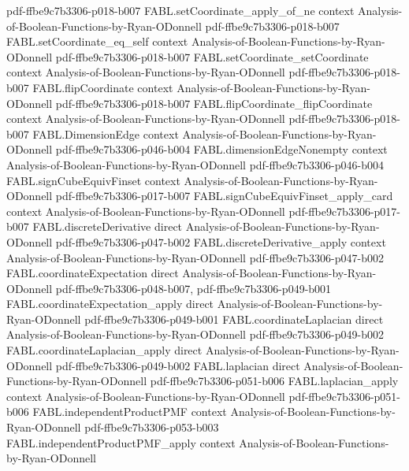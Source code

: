 \begin{theorem}
  {pdf-ffbe9c7b3306-p018-b007}
\proofstep
  {FABL.setCoordinate_apply_of_ne}
  {context}
  {Analysis-of-Boolean-Functions-by-Ryan-ODonnell}
  {pdf-ffbe9c7b3306-p018-b007}
\proofstep
  {FABL.setCoordinate_eq_self}
  {context}
  {Analysis-of-Boolean-Functions-by-Ryan-ODonnell}
  {pdf-ffbe9c7b3306-p018-b007}
\proofstep
  {FABL.setCoordinate_setCoordinate}
  {context}
  {Analysis-of-Boolean-Functions-by-Ryan-ODonnell}
  {pdf-ffbe9c7b3306-p018-b007}
\proofstep
  {FABL.flipCoordinate}
  {context}
  {Analysis-of-Boolean-Functions-by-Ryan-ODonnell}
  {pdf-ffbe9c7b3306-p018-b007}
\proofstep
  {FABL.flipCoordinate_flipCoordinate}
  {context}
  {Analysis-of-Boolean-Functions-by-Ryan-ODonnell}
  {pdf-ffbe9c7b3306-p018-b007}
\proofstep
  {FABL.DimensionEdge}
  {context}
  {Analysis-of-Boolean-Functions-by-Ryan-ODonnell}
  {pdf-ffbe9c7b3306-p046-b004}
\proofstep
  {FABL.dimensionEdgeNonempty}
  {context}
  {Analysis-of-Boolean-Functions-by-Ryan-ODonnell}
  {pdf-ffbe9c7b3306-p046-b004}
\proofstep
  {FABL.signCubeEquivFinset}
  {context}
  {Analysis-of-Boolean-Functions-by-Ryan-ODonnell}
  {pdf-ffbe9c7b3306-p017-b007}
\proofstep
  {FABL.signCubeEquivFinset_apply_card}
  {context}
  {Analysis-of-Boolean-Functions-by-Ryan-ODonnell}
  {pdf-ffbe9c7b3306-p017-b007}
\proofstep
  {FABL.discreteDerivative}
  {direct}
  {Analysis-of-Boolean-Functions-by-Ryan-ODonnell}
  {pdf-ffbe9c7b3306-p047-b002}
\proofstep
  {FABL.discreteDerivative_apply}
  {context}
  {Analysis-of-Boolean-Functions-by-Ryan-ODonnell}
  {pdf-ffbe9c7b3306-p047-b002}
\proofstep
  {FABL.coordinateExpectation}
  {direct}
  {Analysis-of-Boolean-Functions-by-Ryan-ODonnell}
  {pdf-ffbe9c7b3306-p048-b007,
    pdf-ffbe9c7b3306-p049-b001}
\proofstep
  {FABL.coordinateExpectation_apply}
  {direct}
  {Analysis-of-Boolean-Functions-by-Ryan-ODonnell}
  {pdf-ffbe9c7b3306-p049-b001}
\proofstep
  {FABL.coordinateLaplacian}
  {direct}
  {Analysis-of-Boolean-Functions-by-Ryan-ODonnell}
  {pdf-ffbe9c7b3306-p049-b002}
\proofstep
  {FABL.coordinateLaplacian_apply}
  {direct}
  {Analysis-of-Boolean-Functions-by-Ryan-ODonnell}
  {pdf-ffbe9c7b3306-p049-b002}
\proofstep
  {FABL.laplacian}
  {direct}
  {Analysis-of-Boolean-Functions-by-Ryan-ODonnell}
  {pdf-ffbe9c7b3306-p051-b006}
\proofstep
  {FABL.laplacian_apply}
  {context}
  {Analysis-of-Boolean-Functions-by-Ryan-ODonnell}
  {pdf-ffbe9c7b3306-p051-b006}
\proofstep
  {FABL.independentProductPMF}
  {context}
  {Analysis-of-Boolean-Functions-by-Ryan-ODonnell}
  {pdf-ffbe9c7b3306-p053-b003}
\proofstep
  {FABL.independentProductPMF_apply}
  {context}
  {Analysis-of-Boolean-Functions-by-Ryan-ODonnell}

\end{theorem}
